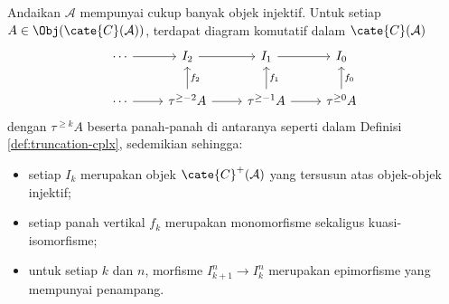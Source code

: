 \begin{lema}\label{prop:K-injective-truncated}
	Andaikan $\mathcal{A}$ mempunyai cukup banyak objek injektif. Untuk setiap
	$A\in\Obj(\cate{C}(\mathcal{A}))$, terdapat diagram komutatif dalam
	$\cate{C}(\mathcal{A})$
	\[\begin{tikzcd}
		\cdots \arrow[r] & I_2 \arrow[r] & I_1 \arrow[r] & I_0 \\
		\cdots \arrow[r] & \tau^{\geq -2} A\arrow[u, "f_2"'] \arrow[r] &
		\tau^{\geq -1} A \arrow[r] \arrow[u, "f_1"'] &
		\tau^{\geq 0} A \arrow[u, "f_0"']
	\end{tikzcd}\]
	dengan $\tau^{\geq k}A$ beserta panah-panah di antaranya seperti dalam
	Definisi \ref{def:truncation-cplx}, sedemikian sehingga:
	\begin{itemize}
		\item setiap $I_k$ merupakan objek
		$\cate{C}^+(\mathcal{A})$ yang tersusun atas objek-objek injektif;
		\item setiap panah vertikal $f_k$ merupakan monomorfisme sekaligus
		kuasi-isomorfisme;
		\item untuk setiap $k$ dan $n$, morfisme
		$I_{k+1}^n\to I_k^n$ merupakan epimorfisme yang mempunyai penampang.
	\end{itemize}
\end{lema}

